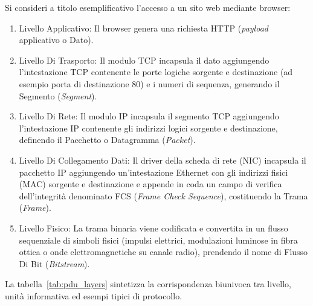 \documentclass[11pt, a4paper]{article}
\begin{document}
Si consideri a titolo esemplificativo l'accesso a un sito web mediante browser:
\begin{enumerate}
    \item Livello Applicativo: Il browser genera una richiesta HTTP (\emph{payload} applicativo o Dato).
    \item Livello Di Trasporto: Il modulo TCP incapsula il dato aggiungendo l'intestazione TCP contenente le porte logiche sorgente e destinazione (ad esempio porta di destinazione 80) e i numeri di sequenza, generando il Segmento (\emph{Segment}).
    \item Livello Di Rete: Il modulo IP incapsula il segmento TCP aggiungendo l'intestazione IP contenente gli indirizzi logici sorgente e destinazione, definendo il Pacchetto o Datagramma (\emph{Packet}).
    \item Livello Di Collegamento Dati: Il driver della scheda di rete (NIC) incapsula il pacchetto IP aggiungendo un'intestazione Ethernet con gli indirizzi fisici (MAC) sorgente e destinazione e appende in coda un campo di verifica dell'integrità denominato FCS (\emph{Frame Check Sequence}), costituendo la Trama (\emph{Frame}).
    \item Livello Fisico: La trama binaria viene codificata e convertita in un flusso sequenziale di simboli fisici (impulsi elettrici, modulazioni luminose in fibra ottica o onde elettromagnetiche su canale radio), prendendo il nome di Flusso Di Bit (\emph{Bitstream}).
\end{enumerate}


La tabella~\ref{tab:pdu_layers} sintetizza la corrispondenza biunivoca tra livello, unità informativa ed esempi tipici di protocollo.
\end{document}
